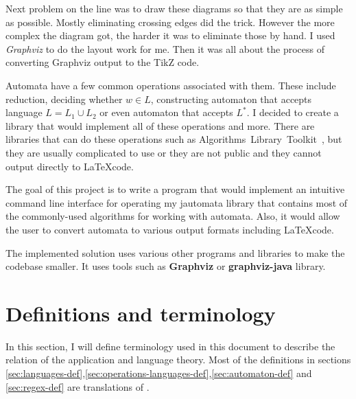 \documentclass{ctuthesis}
\begin{document}
Next problem on the line was to draw these diagrams so that they are as simple as possible. Mostly eliminating crossing edges did the trick. However the more complex the diagram got, the harder it was to eliminate those by hand. I used \textit{Graphviz} to do the layout work for me. Then it was all about the process of converting Graphviz output to the TikZ code.

Automata have a few common operations associated with them. These include reduction, deciding whether $w \in L$, constructing automaton that accepts language $L = L_1 \cup L_2$ or even automaton that accepts $L^*$. I decided to create a library that would implement all of these operations and more. There are libraries that can do these operations such as Algorithms~Library~Toolkit~\cite{alg_lib_toolkit}, but they are usually complicated to use or they are not public and they cannot output directly to \LaTeX code. 

The goal of this project is to write a program that would implement an intuitive command line interface for operating my jautomata library that contains most of the commonly-used algorithms for working with automata. Also, it would allow the user to convert automata to various output formats including \LaTeX code.

The implemented solution uses various other programs and libraries to make the codebase smaller. It uses tools such as \textbf{Graphviz} or \textbf{graphviz-java} library. 

\chapter{Definitions and terminology}
In this section, I will define terminology used in this document to describe the relation of the application and language theory. Most of the definitions in sections \ref{sec:languages-def},\ref{sec:operations-languages-def},\ref{sec:automaton-def} and \ref{sec:regex-def} are translations of \cite{demlova}.
 
\end{document}
